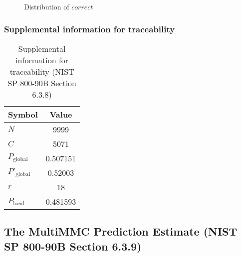 \documentclass[a3paper,xelatex,english]{bxjsarticle}
\begin{document}
\begin{figure}[htbp]
\centering

\caption{Distribution of $correct$}
\end{figure}
\subsubsection{Supplemental information for traceability}
\renewcommand{\arraystretch}{1.8}
\begin{table}[h]
\caption{Supplemental information for traceability (NIST SP 800-90B Section 6.3.8)}
\begin{center}
\begin{tabular}{|l|c|}
\hline 
\rowcolor{anotherlightblue} %
Symbol				& Value \\ \hline 
$N$				& 9999\\ \hline 
$C$				& 5071\\ \hline 
$P_{\textrm{global}}$				& 0.507151\\ \hline 
$P'_{\textrm{global}}$			&  0.52003\\ \hline 
$r$				& 18\\ \hline 
$P_{\textrm{local}}$ 			& 0.481593\\ \hline
\end{tabular}
\end{center}
\end{table}
\renewcommand{\arraystretch}{1.4}
\clearpage
\subsection{The MultiMMC Prediction Estimate (NIST SP 800-90B Section 6.3.9)}\label{sec:Binary639}
\end{document}
